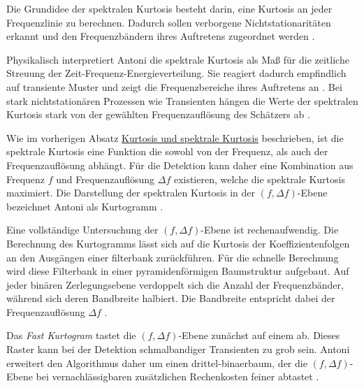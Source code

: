 Die Grundidee der spektralen Kurtosis besteht darin, eine Kurtosis an jeder
Frequenzlinie zu berechnen. Dadurch sollen verborgene
Nichtstationaritäten erkannt und den Frequenzbändern ihres Auftretens
zugeordnet werden
\cite[S.~108, Abschn.~1.1]{antoniFastComputationKurtogram2007}.

Physikalisch interpretiert Antoni die spektrale Kurtosis als Maß für die
zeitliche Streuung der Zeit-Frequenz-Energieverteilung. Sie reagiert dadurch
empfindlich auf transiente Muster und zeigt die Frequenzbereiche ihres
Auftretens an
\cite[S.~290--291, Abschn.~3.2.2]
{antoniSpectralKurtosisUseful2006}.
Bei stark nichtstationären Prozessen wie Transienten hängen die Werte der
spektralen Kurtosis stark von der gewählten Frequenzauflösung des Schätzers ab
\cite[S.~109, Abschn.~1.2]{antoniFastComputationKurtogram2007}.

\label{par:kurtogramm_fast_kurtogram}

Wie im vorherigen Absatz
\hyperref[par:kurtosis_spektrale_kurtosis]{Kurtosis und spektrale Kurtosis}
beschrieben, ist die spektrale Kurtosis eine Funktion die sowohl von der Frequenz, als auch der Frequenzauflösung abhängt. Für die
Detektion kann daher eine Kombination aus Frequenz $f$ und
Frequenzauflösung $\Delta f$ existieren, welche die spektrale Kurtosis
maximiert. Die Darstellung der spektralen Kurtosis in der
$(f,\Delta f)$-Ebene bezeichnet Antoni als Kurtogramm
\cite[S.~109, Abschn.~1.2]{antoniFastComputationKurtogram2007}.

Eine vollständige Untersuchung der $(f,\Delta f)$-Ebene ist
rechenaufwendig. Die Berechnung des Kurtogramms lässt sich auf die
Kurtosis der Koeffizientenfolgen an den Ausgängen einer
\hypertarget{begriff:filterbank}{\gls{filterbank}} zurückführen.
Für die schnelle Berechnung wird diese Filterbank in einer
pyramidenförmigen Baumstruktur aufgebaut. Auf jeder binären Zerlegungsebene
verdoppelt sich die Anzahl der Frequenzbänder, während sich deren Bandbreite
halbiert. Die Bandbreite entspricht dabei der Frequenzauflösung $\Delta f$
\cite[S.~109, Beginn Abschn.~2; S.~110--111, Abschn.~2.1--2.2]
{antoniFastComputationKurtogram2007}.

Das \emph{Fast Kurtogram} tastet die $(f,\Delta f)$-Ebene zunächst auf einem
\hypertarget{begriff:dyadisches-raster}{}
ab. Dieses Raster kann bei der Detektion
schmalbandiger Transienten zu grob sein. Antoni erweitert den
Algorithmus daher um einen
\hypertarget{begriff:drittel-binaerbaum}{\gls{drittel-binaerbaum}}, der die
$(f,\Delta f)$-Ebene bei vernachlässigbaren zusätzlichen
Rechenkosten feiner abtastet
\cite[S.~114, Abschn.~2.5, Abb.~5]
{antoniFastComputationKurtogram2007}.

